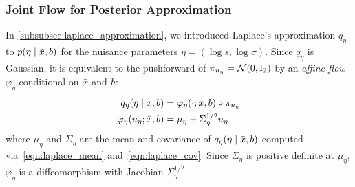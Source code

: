 \subsubsection{Joint Flow for Posterior Approximation}\label{subsubsec:laplace_flow_nuisance}

In \cref{subsubsec:laplace_approximation}, we introduced Laplace's approximation $q_{\eta}$ to $p(\eta \mid \bar{x}, b)$ for the nuisance parameters $\eta = (\log s, \log \sigma)$.
Since $q_{\eta}$ is Gaussian, it is equivalent to the pushforward of $\pi_{u_{\eta}} = \mathcal{N}(\mathrm{0}, \mathrm{I}_2)$ by an \textit{affine flow} $\varphi_{\eta}$ conditional on $\bar{x}$ and $b$:
\begin{align}\label{eqn:laplace_flow}
    \begin{split}
        q_{\eta}(\eta \mid \bar{x}, b)                & = \varphi_{\eta}(\cdot; \bar{x}, b) \circ \pi_{u_{\eta}} \\
        \varphi_{\eta}(u_{\eta}; \bar{x}, b) & = \mu_{\eta} + \Sigma_{\eta}^{1/2}u_{\eta}
    \end{split}
\end{align}
where $\mu_{\eta}$ and $\Sigma_{\eta}$ are the mean and covariance of $q_{\eta}(\eta \mid \bar{x}, b)$ computed via~\eqref{eqn:laplace_mean} and~\eqref{eqn:laplace_cov}.
Since $\Sigma_{\eta}$ is positive definite at $\mu_{\eta}$, $\varphi_{\eta}$ is a diffeomorphism with Jacobian $\Sigma_{\eta}^{1/2}$.


